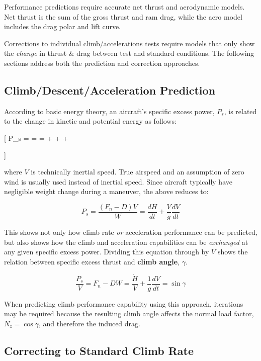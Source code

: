 \documentclass[
]{book}
\begin{document}
Performance predictions require accurate net thrust and aerodynamic models. Net
thrust is the sum of the gross thrust and ram drag, while the aero model
includes the drag polar and lift curve.

Corrections to individual climb/accelerations tests require models that only
show the \emph{change} in thrust \& drag between test and standard conditions. The
following sections address both the prediction and correction approaches.

\hypertarget{climbdescentacceleration-prediction}{%
\subsection{Climb/Descent/Acceleration Prediction}\label{climbdescentacceleration-prediction}}

According to basic energy theory, an aircraft's specific excess power, \(P_s\),
is related to the change in kinetic and potential energy as follows:

{[}
P\_s =  =  =  +   +  +  

\label{eq:p-sub-s}
{]}

where \(V\) is technically inertial speed. True airspeed and an assumption of
zero wind is usually used instead of inertial speed. Since aircraft typically
have negligible weight change during a maneuver, the above reduces to:

\[
P_s = \frac{\left( F_n - D \right) V}{W} = \frac{dH}{dt} + \frac{V}{g}\frac{dV}{dt}
\label{eq:p-sub-s-redux}
\]

This shows not only how climb rate \emph{or} acceleration performance can be
predicted, but also shows how the climb and acceleration capabilities can be
\emph{exchanged} at any given specific excess power. Dividing this equation through
by \(V\) shows the relation between specific excess thrust and \textbf{climb angle},
\textbf{\(\gamma\)}.

\[
\frac{P_s}{V} = {F_n - D}{W} = \frac{\dot{H}}{V} + \frac{1}{g} \frac{dV}{dt} = \sin \gamma
\label{eq:p-sub-s-over-v}
\]

When predicting climb performance capability using this approach, iterations may
be required because the resulting climb angle affects the normal load factor,
\(N_z = \cos \gamma\), and therefore the induced drag.

\hypertarget{correcting-to-standard-climb-rate}{%
\subsection{Correcting to Standard Climb Rate}\label{correcting-to-standard-climb-rate}}
\end{document}

